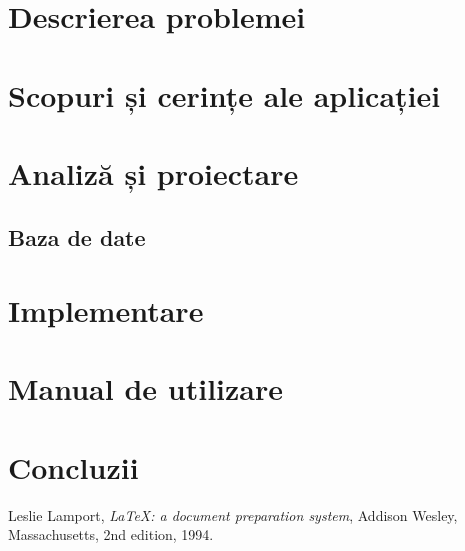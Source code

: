 \documentclass[12pt,a4paper]{report}
\begin{document}
\section{Descrierea problemei}
\section{Scopuri și cerințe ale aplicației}
\section{Analiză și proiectare}
\subsection{Baza de date}
\section{Implementare}
\section{Manual de utilizare}
\section{Concluzii}

\renewcommand\bibname{Bibliografie}
\begin{thebibliography}{9}

  Leslie Lamport,
  \textit{\LaTeX: a document preparation system},
  Addison Wesley, Massachusetts,
  2nd edition,
  1994.

\end{thebibliography}
\end{document}
